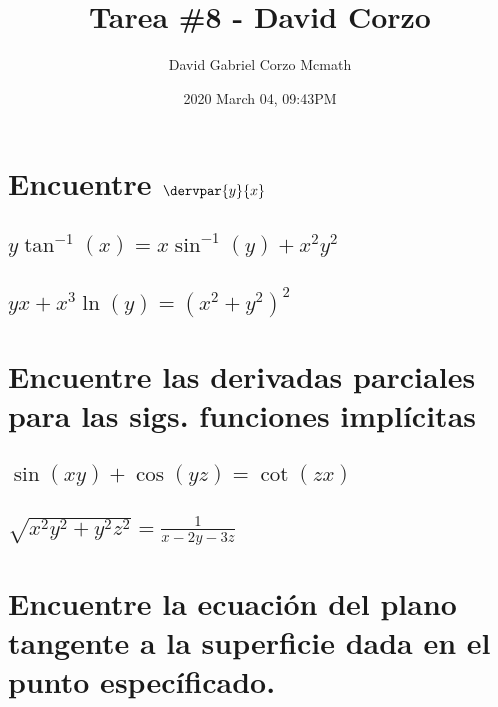 \documentclass{article}
\title{Tarea \#8 - David Corzo}
\date{2020 March 04, 09:43PM}
\author{David Gabriel Corzo Mcmath}
\begin{document}
\maketitle

\section{Encuentre $\displaystyle \dervpar{y}{x}$}
\subsection{$\displaystyle y\tan^{-1}(x)=x\sin^{-1}(y)+x^2y^2$}  

\subsection{$\displaystyle yx+x^3\ln(y)=\left(x^2+y^2\right)^2$}


\section{Encuentre las derivadas parciales para las sigs. funciones implícitas}

\subsection{$\displaystyle \sin(xy)+\cos(yz)=\cot(zx)$}

\subsection{$\displaystyle \sqrt{x^2y^2+y^2z^2}=\frac{1}{x-2y-3z} $}




\section{Encuentre la ecuación del plano tangente a la superficie dada en el punto específicado.}
\end{document}
